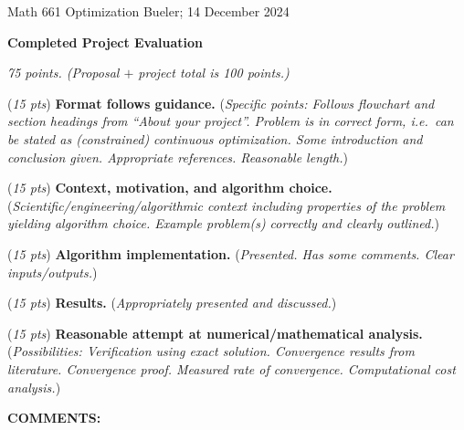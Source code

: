 \documentclass[12pt]{amsart}
\begin{document}
\scriptsize \noindent Math 661 Optimization \hfill  Bueler; 14 December 2024
\normalsize\bigskip

\thispagestyle{empty}
\noindent\large\centerline{\textbf{Completed Project Evaluation}} \normalsize

\medskip
\noindent\centerline{\emph{75 points.  (Proposal $+$ project total is 100 points.)}}

\bigskip\bigskip

\noindent (\emph{15 pts}) \textbf{Format follows guidance.} (\emph{Specific points:  Follows flowchart and section headings from ``About your project''.  Problem is in correct form, i.e.~can be stated as (constrained) continuous optimization.  Some introduction and conclusion given.  Appropriate references.  Reasonable length.})
\vspace{0.6in}

\noindent (\emph{15 pts}) \textbf{Context, motivation, and algorithm choice.}  (\emph{Scientific/engineering/algorithmic context including properties of the problem yielding algorithm choice.  Example problem(s) correctly and clearly outlined.})
\vspace{0.6in}

\noindent (\emph{15 pts}) \textbf{Algorithm implementation.}  (\emph{Presented.  Has some comments.  Clear inputs/outputs.})
\vspace{0.6in}

\noindent (\emph{15 pts}) \textbf{Results.}  (\emph{Appropriately presented and discussed.})
\vspace{0.6in}

\noindent (\emph{15 pts}) \textbf{Reasonable attempt at numerical/mathematical analysis.}  (\emph{Possibilities:  Verification using exact solution.  Convergence results from literature.  Convergence proof.  Measured rate of convergence.  Computational cost analysis.})
\vspace{0.8in}


\noindent \textbf{COMMENTS:}
\vfill
\end{document}
